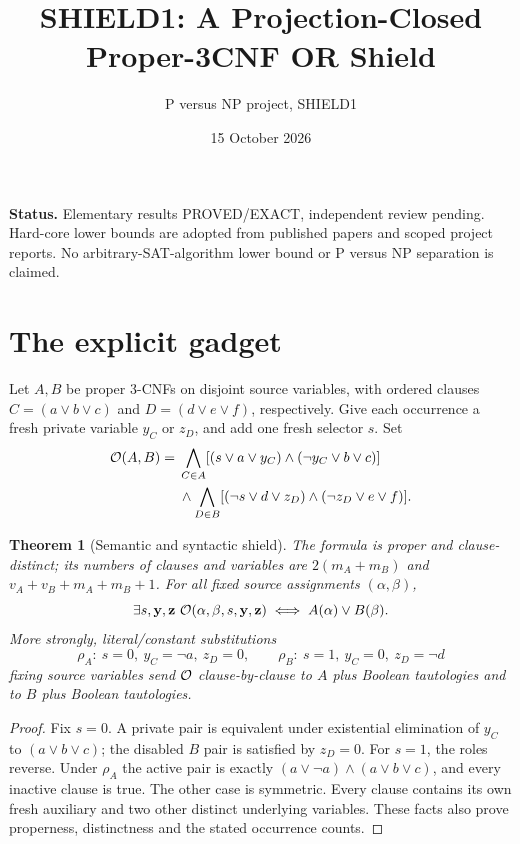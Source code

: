 \documentclass[11pt]{article}
\title{SHIELD1: A Projection-Closed Proper-3CNF OR Shield}
\author{P versus NP project, SHIELD1}
\date{15 October 2026}
\newtheorem{theorem}{Theorem}
\begin{document}
\maketitle
\noindent\textbf{Status.} Elementary results PROVED/EXACT, independent review pending.
Hard-core lower bounds are adopted from published papers and scoped project
reports. No arbitrary-SAT-algorithm lower bound or P versus NP separation is claimed.

\section{The explicit gadget}
Let $A,B$ be proper 3-CNFs on disjoint source variables, with ordered
clauses $C=(a\vee b\vee c)$ and $D=(d\vee e\vee f)$, respectively.
Give each occurrence a fresh private variable $y_C$ or $z_D$, and add
one fresh selector $s$. Set
\[
\begin{split}
{\cal O}(A,B)={}&\bigwedge_{C\in A}
[(s\vee a\vee y_C)\wedge(\neg y_C\vee b\vee c)]\\
&\wedge\bigwedge_{D\in B}
[(\neg s\vee d\vee z_D)\wedge(\neg z_D\vee e\vee f)].
\end{split}
\]
\begin{theorem}[Semantic and syntactic shield]
The formula is proper and clause-distinct; its numbers of clauses and
variables are $2(m_A+m_B)$ and $v_A+v_B+m_A+m_B+1$.
For all fixed source assignments $(\alpha,\beta)$,
\[
 \exists s,\mathbf y,\mathbf z\ {\cal O}(\alpha,\beta,s,\mathbf y,\mathbf z)
 \iff A(\alpha)\vee B(\beta).
\]
More strongly, literal/constant substitutions
\[
\rho_A:\ s=0,\ y_C=\neg a,\ z_D=0,\qquad
\rho_B:\ s=1,\ y_C=0,\ z_D=\neg d
\]
fixing source variables send \({\cal O}\) clause-by-clause to
$A$ plus Boolean tautologies and to $B$ plus Boolean tautologies.
\end{theorem}
\begin{proof}
Fix $s=0$. A private pair is equivalent under existential elimination
of $y_C$ to $(a\vee b\vee c)$; the disabled $B$ pair is satisfied by
$z_D=0$. For $s=1$, the roles reverse. Under $\rho_A$ the active
pair is exactly $(a\vee\neg a)\wedge(a\vee b\vee c)$,
and every inactive clause is true. The other case is symmetric.
Every clause contains its own fresh auxiliary and two other distinct
underlying variables. These facts also prove properness, distinctness
and the stated occurrence counts.
\end{proof}
\end{document}
